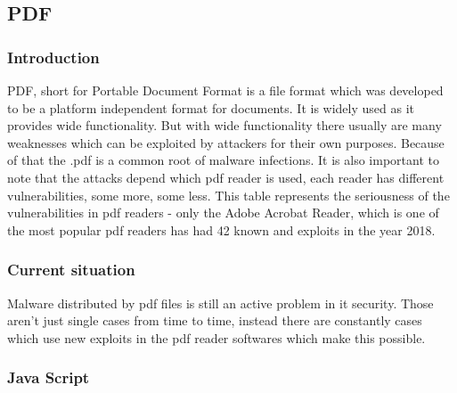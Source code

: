 \documentclass[a4paper,10pt]{article}
\begin{document}
\subsection{PDF}
\subsubsection{Introduction}
PDF, short for Portable Document Format is a file format which was developed to be a platform independent format for documents. It is widely used as it provides wide functionality. But with wide functionality there usually are many weaknesses which can be exploited by attackers for their own purposes. Because of that the .pdf is a common root of malware infections. It is also important to note that the attacks depend which pdf reader is used, each reader has different vulnerabilities, some more, some less. This table represents the seriousness of the vulnerabilities in pdf readers - only the Adobe Acrobat Reader, which is one of the most popular pdf readers has had 42 known and exploits in the year 2018.\cite{adobeacrobatreader:cvesecurityvulnerabilities}

\subsubsection{Current situation}
Malware distributed by pdf files is still an active problem in it security. Those aren't just single cases from time to time, instead there are constantly cases which use new exploits in the pdf reader softwares which make this possible.

\subsubsection{Java Script}
\end{document}
